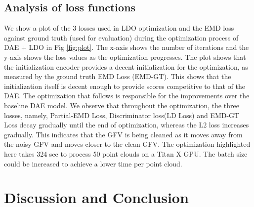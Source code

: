 \documentclass[10pt,twocolumn,letterpaper]{article}
\begin{document}
\subsection{Analysis of loss functions}
We show a plot of the 3 losses used in LDO optimization and the EMD loss against ground truth (used for evaluation) during the optimization process of DAE + LDO in Fig \ref{fig:plot}. The x-axis shows the number of iterations and the y-axis shows the loss values as the optimization progresses. The plot shows that the initialization encoder provides a decent initialization for the optimization, as measured by the ground truth EMD Loss (EMD-GT). This shows that the initialization itself is decent enough to provide scores competitive to that of the DAE. The optimization that follows is responsible for the improvements over the baseline DAE model. We observe that throughout the optimization, the three losses, namely, Partial-EMD Loss, Discriminator loss(LD Loss) and EMD-GT Loss decay gradually until the end of optimization, whereas the L2 loss increases gradually. This indicates that the GFV is being cleaned as it moves away from the noisy GFV and moves closer to the clean GFV. The optimization highlighted here takes 324 sec to process 50 point clouds on a Titan X GPU. The batch size could be increased to achieve a lower time per point cloud.

\section{Discussion and Conclusion}
\end{document}
